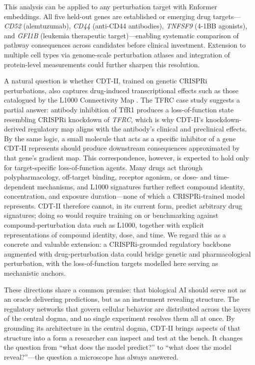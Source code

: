 \documentclass[12pt,a4paper]{article}
\begin{document}
This analysis can be applied to any perturbation target with Enformer embeddings. All five held-out genes are established or emerging drug targets---\textit{CD52} (alemtuzumab), \textit{CD44} (anti-CD44 antibodies), \textit{TNFSF9} (4-1BB agonists), and \textit{GFI1B} (leukemia therapeutic target)---enabling systematic comparison of pathway consequences across candidates before clinical investment. Extension to multiple cell types via genome-scale perturbation atlases \citep{shalem2014,replogle2022} and integration of protein-level measurements could further sharpen this resolution.

A natural question is whether CDT-II, trained on genetic CRISPRi perturbations, also captures drug-induced transcriptional effects such as those catalogued by the L1000 Connectivity Map \citep{subramanian2017l1000}. The TFRC case study suggests a partial answer: antibody inhibition of TfR1 produces a loss-of-function state resembling CRISPRi knockdown of \textit{TFRC}, which is why CDT-II's knockdown-derived regulatory map aligns with the antibody's clinical and preclinical effects. By the same logic, a small molecule that acts as a specific inhibitor of a gene CDT-II represents should produce downstream consequences approximated by that gene's gradient map. This correspondence, however, is expected to hold only for target-specific loss-of-function agents. Many drugs act through polypharmacology, off-target binding, receptor agonism, or dose- and time-dependent mechanisms, and L1000 signatures further reflect compound identity, concentration, and exposure duration---none of which a CRISPRi-trained model represents. CDT-II therefore cannot, in its current form, predict arbitrary drug signatures; doing so would require training on or benchmarking against compound-perturbation data such as L1000, together with explicit representations of compound identity, dose, and time. We regard this as a concrete and valuable extension: a CRISPRi-grounded regulatory backbone augmented with drug-perturbation data could bridge genetic and pharmacological perturbation, with the loss-of-function targets modelled here serving as mechanistic anchors.

These directions share a common premise: that biological AI should serve not as an oracle delivering predictions, but as an instrument revealing structure. The regulatory networks that govern cellular behavior are distributed across the layers of the central dogma, and no single experiment resolves them all at once. By grounding its architecture in the central dogma, CDT-II brings aspects of that structure into a form a researcher can inspect and test at the bench. It changes the question from ``what does the model predict?'' to ``what does the model reveal?''---the question a microscope has always answered.
\end{document}
